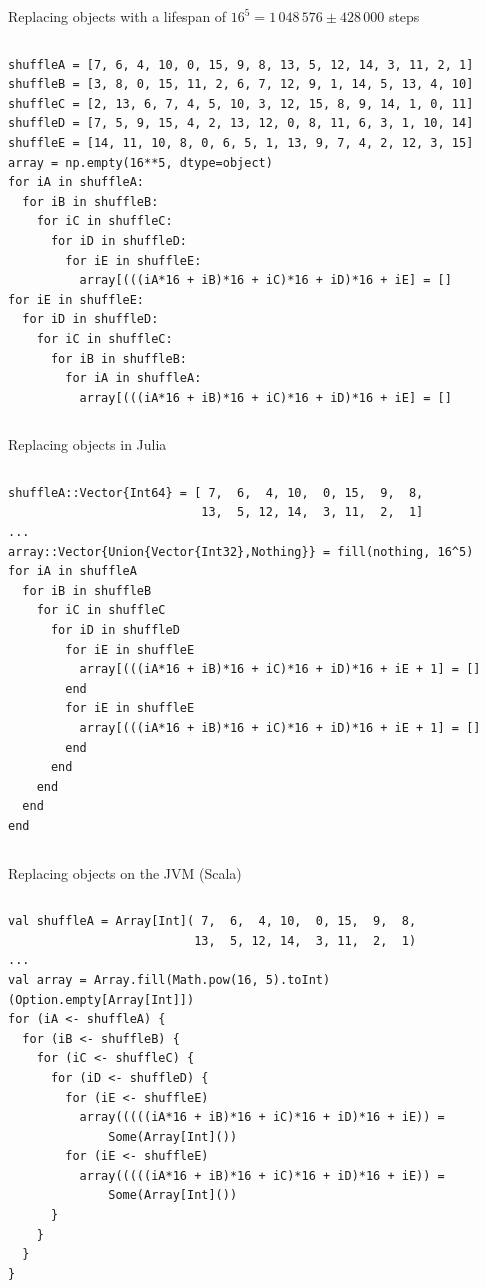 \documentclass[aspectratio=169]{beamer}
\begin{document}
\begin{frame}[fragile]{Replacing objects with a lifespan of $16^5 = 1\,048\,576 \pm 428\,000$ steps}
\small
\begin{columns}
\begin{verbatim}
shuffleA = [7, 6, 4, 10, 0, 15, 9, 8, 13, 5, 12, 14, 3, 11, 2, 1]
shuffleB = [3, 8, 0, 15, 11, 2, 6, 7, 12, 9, 1, 14, 5, 13, 4, 10]
shuffleC = [2, 13, 6, 7, 4, 5, 10, 3, 12, 15, 8, 9, 14, 1, 0, 11]
shuffleD = [7, 5, 9, 15, 4, 2, 13, 12, 0, 8, 11, 6, 3, 1, 10, 14]
shuffleE = [14, 11, 10, 8, 0, 6, 5, 1, 13, 9, 7, 4, 2, 12, 3, 15]
array = np.empty(16**5, dtype=object)
for iA in shuffleA:
  for iB in shuffleB:
    for iC in shuffleC:
      for iD in shuffleD:
        for iE in shuffleE:
          array[(((iA*16 + iB)*16 + iC)*16 + iD)*16 + iE] = []
for iE in shuffleE:
  for iD in shuffleD:
    for iC in shuffleC:
      for iB in shuffleB:
        for iA in shuffleA:
          array[(((iA*16 + iB)*16 + iC)*16 + iD)*16 + iE] = []
\end{verbatim}
\end{columns}
\end{frame}

\begin{frame}[fragile]{Replacing objects in Julia}
\small
\begin{columns}
\begin{verbatim}
shuffleA::Vector{Int64} = [ 7,  6,  4, 10,  0, 15,  9,  8,
                           13,  5, 12, 14,  3, 11,  2,  1]
...
array::Vector{Union{Vector{Int32},Nothing}} = fill(nothing, 16^5)
for iA in shuffleA
  for iB in shuffleB
    for iC in shuffleC
      for iD in shuffleD
        for iE in shuffleE
          array[(((iA*16 + iB)*16 + iC)*16 + iD)*16 + iE + 1] = []
        end
        for iE in shuffleE
          array[(((iA*16 + iB)*16 + iC)*16 + iD)*16 + iE + 1] = []
        end
      end
    end
  end
end
\end{verbatim}
\end{columns}
\end{frame}

\begin{frame}[fragile]{Replacing objects on the JVM (Scala)}
\small
\begin{columns}
\begin{verbatim}
val shuffleA = Array[Int]( 7,  6,  4, 10,  0, 15,  9,  8,
                          13,  5, 12, 14,  3, 11,  2,  1)
...
val array = Array.fill(Math.pow(16, 5).toInt)(Option.empty[Array[Int]])
for (iA <- shuffleA) {
  for (iB <- shuffleB) {
    for (iC <- shuffleC) {
      for (iD <- shuffleD) {
        for (iE <- shuffleE)
          array(((((iA*16 + iB)*16 + iC)*16 + iD)*16 + iE)) =
              Some(Array[Int]())
        for (iE <- shuffleE)
          array(((((iA*16 + iB)*16 + iC)*16 + iD)*16 + iE)) =
              Some(Array[Int]())
      }
    }
  }
}
\end{verbatim}
\end{columns}
\end{frame}
\end{document}

